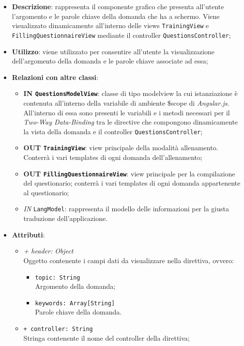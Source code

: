 		\begin{itemize}
			\item \textbf{Descrizione}: rappresenta il componente grafico che presenta all'utente l'argomento e le parole chiave della domanda che ha a schermo. Viene visualizzato dinamicamente all'interno delle views \texttt{TrainingView} e \texttt{FillingQuestionnaireView} mediante il controller \texttt{QuestionsController};
			\item \textbf{Utilizzo}: viene utilizzato per consentire all'utente la visualizzazione dell'argomento della domanda e le parole chiave associate ad essa;
			\item \textbf{Relazioni con altre classi}: 
			\begin{itemize}
				\item \textbf{IN \texttt{QuestionsModelView}}: classe di tipo modelview la cui istanziazione è contenuta all'interno della variabile di ambiente \$scope di \textit{Angular.js}. All'interno di essa sono presenti le variabili e i metodi necessari per il \textit{Two-Way Data-Binding} tra le directive che compongono dinamicamente la vista della domanda e il controller \texttt{QuestionsController};
				\item \textbf{OUT \texttt{TrainingView}}: view principale della modalità allenamento. Conterrà i vari templates di ogni domanda dell'allenamento;
				\item \textbf{OUT \texttt{FillingQuestionnaireView}}: view principale per la compilazione del questionario; conterrà i vari templates di ogni domanda appartenente al questionario;   
				\item \textit{IN} \texttt{LangModel}: rappresenta il modello delle informazioni per la giusta traduzione dell'applicazione.
			\end{itemize}
			\item \textbf{Attributi}:
			\begin{itemize}
				\item \textit{+ header: Object} \\ Oggetto contenente i campi dati da visualizzare nella direttiva, ovvero:
				\begin{itemize}
					\item \texttt{topic: String} \\ Argomento della domanda;
					\item \texttt{keywords: Array[String]} \\ Parole chiave della domanda.
				\end{itemize}
				\item \texttt{+ controller: String} \\ Stringa contenente il nome del controller della direttiva;

\end{itemize}
\end{itemize}
